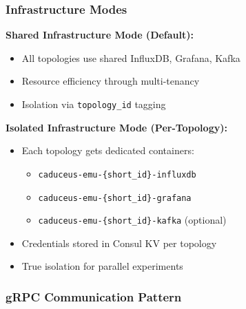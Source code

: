 \documentclass[10pt,a4paper]{article}
\begin{document}
\subsubsection{Infrastructure Modes}

\textbf{Shared Infrastructure Mode (Default):}
\begin{itemize}
\item All topologies use shared InfluxDB, Grafana, Kafka
\item Resource efficiency through multi-tenancy
\item Isolation via \texttt{topology\_id} tagging
\end{itemize}

\textbf{Isolated Infrastructure Mode (Per-Topology):}
\begin{itemize}
\item Each topology gets dedicated containers:
\begin{itemize}
\item \texttt{caduceus-emu-\{short\_id\}-influxdb}
\item \texttt{caduceus-emu-\{short\_id\}-grafana}
\item \texttt{caduceus-emu-\{short\_id\}-kafka} (optional)
\end{itemize}
\item Credentials stored in Consul KV per topology
\item True isolation for parallel experiments
\end{itemize}

\subsubsection{gRPC Communication Pattern}
\end{document}
